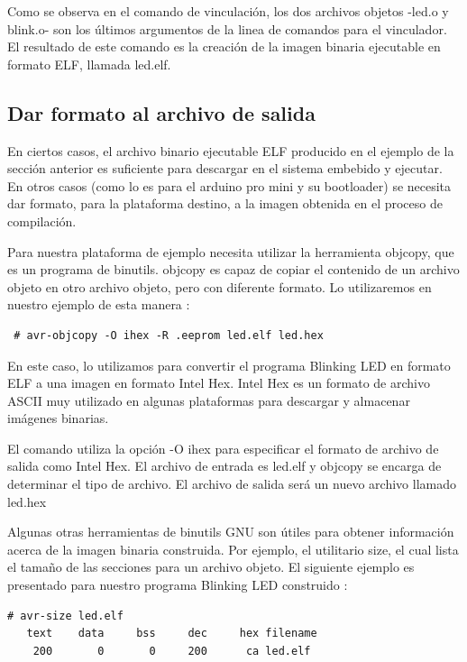 \documentclass[output=paper, 
colorlinks,
citecolor=brown,
newtxmath
]{langscibook}
\begin{document}
Como se observa en el comando de vinculación, los dos archivos objetos -led.o y blink.o-
son los últimos argumentos de la linea de comandos para el vinculador.
El resultado de este comando es la creación de la imagen binaria ejecutable
en formato ELF, llamada led.elf.

\subsection {Dar formato al archivo de salida}

En ciertos casos, el archivo binario ejecutable ELF producido en el 
ejemplo de la sección anterior es suficiente para descargar en el sistema 
embebido y ejecutar. En otros casos (como lo es para el arduino pro mini
y su bootloader) se necesita dar formato, para la plataforma destino,
 a la imagen obtenida
en el proceso de compilación.

Para nuestra plataforma de ejemplo necesita utilizar la herramienta
objcopy, que es un programa de binutils.
objcopy es capaz de copiar el contenido de un archivo objeto en otro 
archivo objeto, pero con diferente formato.
Lo utilizaremos en nuestro ejemplo de esta manera :

\begin{verbatim}
 # avr-objcopy -O ihex -R .eeprom led.elf led.hex
\end{verbatim}

En este caso, lo utilizamos para convertir el programa Blinking LED 
en formato ELF a una imagen en formato Intel Hex. Intel Hex 
es un formato de archivo ASCII muy utilizado en algunas plataformas
para descargar y almacenar imágenes binarias.

El comando utiliza la opción -O ihex para especificar el formato 
de archivo de salida como Intel Hex. El archivo de entrada es led.elf
y objcopy se encarga de determinar el tipo de archivo. El archivo de salida
será un nuevo archivo llamado led.hex

Algunas otras herramientas de binutils GNU son útiles para obtener 
información acerca de la imagen binaria construida.
Por ejemplo, el utilitario size, el cual lista el tamaño de las secciones
para un archivo objeto. El siguiente ejemplo es presentado
para nuestro programa Blinking LED construido :

\begin{verbatim}
# avr-size led.elf
   text	   data	    bss	    dec	    hex	filename
    200	      0	      0	    200	     ca	led.elf
\end{verbatim}
\end{document}
